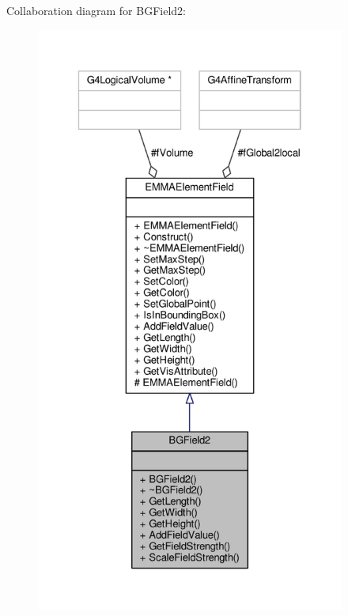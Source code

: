 Collaboration diagram for B\+G\+Field2\+:
\nopagebreak
\begin{figure}[H]
\begin{center}
\leavevmode
\includegraphics[height=550pt]{classBGField2__coll__graph}
\end{center}
\end{figure}
